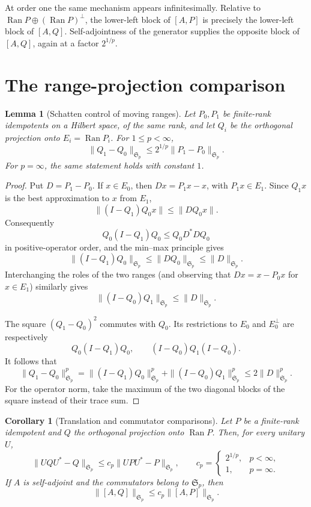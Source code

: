 \documentclass[11pt]{article}
\newtheorem{lemma}{Lemma}
\newtheorem{corollary}{Corollary}
\newcommand{\Sp}{\mathfrak S}
\newcommand{\Ran}{\operatorname{Ran}}
\begin{document}
At order one the same mechanism appears infinitesimally.  Relative to
$\Ran P\oplus(\Ran P)^\perp$, the lower-left block of $[A,P]$ is precisely the
lower-left block of $[A,Q]$.  Self-adjointness of the generator supplies the
opposite block of $[A,Q]$, again at a factor $2^{1/p}$.

\section*{The range-projection comparison}

\begin{lemma}[Schatten control of moving ranges]\label{lem:range}
Let $P_0,P_1$ be finite-rank idempotents on a Hilbert space, of the same rank,
and let $Q_i$ be the orthogonal projection onto $E_i=\Ran P_i$.  For
$1\le p<\infty$,
\[
  \|Q_1-Q_0\|_{\Sp_p}
  \le 2^{1/p}\|P_1-P_0\|_{\Sp_p}.
\]
For $p=\infty$, the same statement holds with constant $1$.
\end{lemma}

\begin{proof}
Put $D=P_1-P_0$.  If $x\in E_0$, then
$Dx=P_1x-x$, with $P_1x\in E_1$.  Since $Q_1x$ is the best approximation to
$x$ from $E_1$,
\[
 \|(I-Q_1)Q_0x\|\le \|DQ_0x\|.
\]
Consequently
\[
 Q_0(I-Q_1)Q_0\le Q_0D^*DQ_0
\]
in positive-operator order, and the min--max principle gives
\[
 \|(I-Q_1)Q_0\|_{\Sp_p}\le \|DQ_0\|_{\Sp_p}
 \le \|D\|_{\Sp_p}.
\]
Interchanging the roles of the two ranges (and observing that
$Dx=x-P_0x$ for $x\in E_1$) similarly gives
\[
 \|(I-Q_0)Q_1\|_{\Sp_p}\le \|D\|_{\Sp_p}.
\]

The square $(Q_1-Q_0)^2$ commutes with $Q_0$.  Its restrictions to
$E_0$ and $E_0^\perp$ are respectively
\[
 Q_0(I-Q_1)Q_0,
 \qquad
 (I-Q_0)Q_1(I-Q_0).
\]
It follows that
\[
 \|Q_1-Q_0\|_{\Sp_p}^p
 =\|(I-Q_1)Q_0\|_{\Sp_p}^p
  +\|(I-Q_0)Q_1\|_{\Sp_p}^p
 \le 2\|D\|_{\Sp_p}^p.
\]
For the operator norm, take the maximum of the two diagonal blocks of the
square instead of their trace sum.
\end{proof}

\begin{corollary}[Translation and commutator comparisons]\label{cor:compare}
Let $P$ be a finite-rank idempotent and $Q$ the orthogonal projection onto
$\Ran P$.  Then, for every unitary $U$,
\[
 \|UQU^*-Q\|_{\Sp_p}
 \le c_p\|UPU^*-P\|_{\Sp_p},
 \qquad
 c_p=\begin{cases}2^{1/p},&p<\infty,\\1,&p=\infty.\end{cases}
\]
If $A$ is self-adjoint and the commutators belong to $\Sp_p$, then
\[
 \|[A,Q]\|_{\Sp_p}\le c_p\|[A,P]\|_{\Sp_p}.
\]
\end{corollary}
\end{document}
